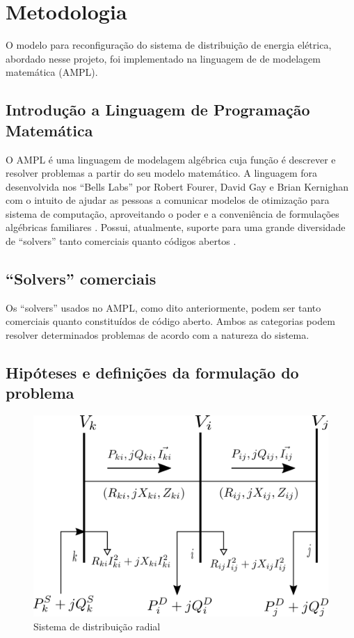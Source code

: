 \section{Metodologia}

O modelo para reconfiguração do sistema de distribuição de energia elétrica, abordado nesse projeto, foi implementado na linguagem de de modelagem matemática (AMPL).

\subsection{Introdução a Linguagem de Programação Matemática}

O AMPL é uma linguagem de modelagem algébrica cuja função é descrever e resolver problemas a partir do seu modelo matemático. 
A linguagem fora desenvolvida nos ``Bells Labs'' por Robert Fourer, David Gay e Brian Kernighan com o intuito de ajudar as pessoas a comunicar modelos de otimização para sistema de computação, aproveitando o poder e a conveniência de formulações algébricas familiares \cite{ampl}. 
Possui, atualmente, suporte para uma grande diversidade de ``solvers'' tanto comerciais quanto códigos abertos .

\subsection{``Solvers'' comerciais}

Os ``solvers'' usados no AMPL, como dito anteriormente, podem ser tanto comerciais quanto constituídos de código aberto.
Ambos as categorias podem resolver determinados problemas de acordo com a natureza do sistema. 

\subsection{Hipóteses e definições da formulação do problema}

\begin{figure}[H]
    \centering
    \includegraphics[scale = 1.2]{01_img/diagrama_nos.png}
    \caption{Sistema de distribuição radial}
    \label{fig:SDR}

\end{figure}

